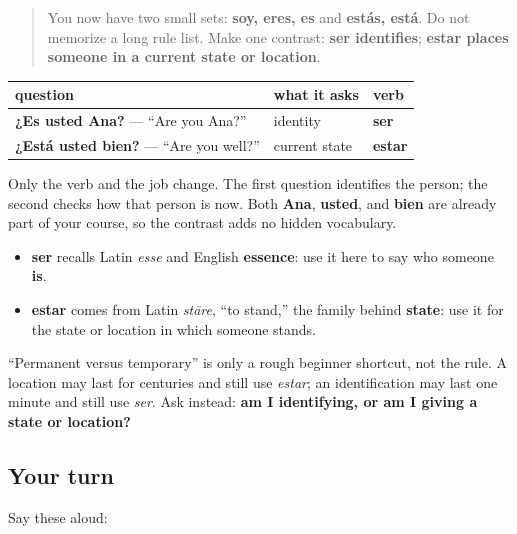 \begin{quote}
You now have two small sets: \textbf{soy, eres, es} and \textbf{estás, está}. Do not memorize a long rule list. Make one contrast: \textbf{ser identifies}; \textbf{estar places someone in a current state or location}.
\end{quote}

\begin{grammarlens}[title={Grammar Lens: the first contrast, from known material}]
\noindent
\begin{tabularx}{\linewidth}{@{}>{\raggedright\arraybackslash}X>{\raggedright\arraybackslash}X>{\raggedright\arraybackslash}X@{}}
\toprule
\textbf{question} & \textbf{what it asks} & \textbf{verb} \\
\midrule
\textbf{¿Es usted Ana?} — “Are you Ana?” & identity & \textbf{ser} \\
\textbf{¿Está usted bien?} — “Are you well?” & current state & \textbf{estar} \\
\bottomrule
\end{tabularx}

Only the verb and the job change. The first question identifies the person; the second checks how that person is now. Both \textbf{Ana}, \textbf{usted}, and \textbf{bien} are already part of your course, so the contrast adds no hidden vocabulary.
\end{grammarlens}

\begin{grammarlens}[title={Grammar Lens: a memory hook, not a law}]
\begin{itemize}
\raggedright
  \item \textbf{ser} recalls Latin \emph{esse} and English \textbf{essence}: use it here to say who someone \textbf{is}.
  \item \textbf{estar} comes from Latin \emph{stāre}, “to stand,” the family behind \textbf{state}: use it for the state or location in which someone stands.
\end{itemize}

“Permanent versus temporary” is only a rough beginner shortcut, not the rule. A location may last for centuries and still use \emph{estar}; an identification may last one minute and still use \emph{ser}. Ask instead: \textbf{am I identifying, or am I giving a state or location?}
\end{grammarlens}

\subsection*{Your turn}
Say these aloud:

